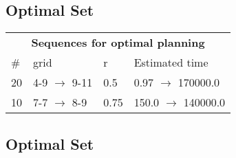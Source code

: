 \documentclass{article}
\begin{document}
                            \subsection*{Optimal Set}

                            \begin{center}
                            \begin{tabular}{@{}l|l|l|l@{}}
                            \multicolumn{4}{c}{\bf \large Sequences for optimal planning}\\
                            \# & grid & r & Estimated time\\\midrule
                            20&4-9 $\rightarrow$ 9-11&0.5&0.97 $\rightarrow$ 170000.0\\
10&7-7 $\rightarrow$ 8-9&0.75&150.0 $\rightarrow$ 140000.0
                            \end{tabular}
                            \end{center}
                    
                                \subsection*{Optimal Set}
                                
\end{document}
